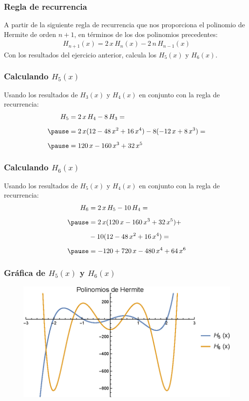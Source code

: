 \documentclass[12pt]{beamer}
\begin{document}
\begin{frame}
\frametitle{Regla de recurrencia}
A partir de la siguiente regla de recurrencia que nos proporciona el polinomio de Hermite de orden $n + 1$, en términos de los dos polinomios precedentes:
\pause
\begin{align*}
H_{n+1} (x) = 2 \, x \, H_{n} (x) - 2 \, n \, H_{n - 1} (x)
\end{align*}
Con los resultados del ejercicio anterior, calcula los $H_{5} (x)$ y $H_{6} (x)$.
\end{frame}
\begin{frame}
\frametitle{Calculando $H_{5} (x)$}
Usando los resultados de $H_{3} (x)$ y $H_{4} (x)$ en conjunto con la regla de recurrencia:
\pause
\begin{eqnarray*}
\begin{aligned}
H_{5} &= 2 \, x \, H_{4} - 8 \, H_{3} = \\[0.5em] \pause
&= 2 \, x (12 - 48 \, x^{2} + 16 \, x^{4}) - 8 (- 12 \, x + 8 \, x^{3}) = \\[0.5em] \pause
&= 120 \, x - 160 \, x^{3} + 32 \, x^{5}
\end{aligned}
\end{eqnarray*}
\end{frame}
\begin{frame}
\frametitle{Calculando $H_{6} (x)$}
Usando los resultados de $H_{5} (x)$ y $H_{4} (x)$ en conjunto con la regla de recurrencia:
\pause
\begin{eqnarray*}
\begin{aligned}
H_{6} &= 2 \, x \, H_{5} - 10 \, H_{4} = \\[0.5em] \pause
&= 2 \, x (120 \, x - 160 \, x^{3} + 32 \, x^{5}) + \\[0.5em] 
&- 10 (12 - 48 \, x^{2} + 16 \, x^{4}) = \\[0.5em] \pause
&= - 120 + 720 \, x - 480 \, x^{4} + 64 \, x^{6}
\end{aligned}
\end{eqnarray*}
\end{frame}
\begin{frame}
\frametitle{Gráfica de $H_{5} (x)$ y $H_{6} (x)$}
\begin{figure}
  \centering
  \includegraphics[scale=0.95]{Imagenes/Plot_Hermite_H5_H6.eps}
\end{figure}
\end{frame}
\end{document}
